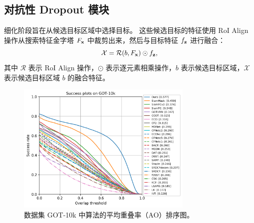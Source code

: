 \subsection{对抗性 Dropout 模块}
\label{sec:stage2}
细化阶段旨在从候选目标区域中选择目标。
这些候选目标的特征使用 RoI Align \cite{he2017mask} 操作从搜索特征金字塔 $F_{\textbf x}$ 中裁剪出来，然后与目标特征 $f_{\textbf z}$ 进行融合：
\begin{equation}
    \mathcal{X} = \mathcal{R}(b, F_{\textbf x}) \odot f_{\textbf z},
\end{equation}
其中 $\mathcal{R}$ 表示 RoI Align 操作，$\odot$ 表示逐元素相乘操作，$b$ 表示候选目标区域，$\mathcal{X}$ 表示候选目标区域 $b$ 的融合特征。

\begin{figure}[t]
    \centering
    \includegraphics[width=0.75\textwidth]{Img/end/success_plot.png}
    \caption{数据集 GOT-10k \cite{GOT-10k} 中算法的平均重叠率（AO）排序图。}
    \label{fig:end_got10k}
\end{figure}

